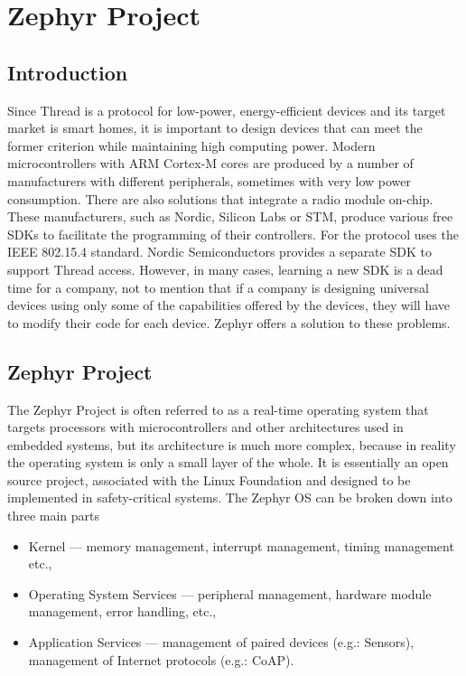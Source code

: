 \section{Zephyr Project}


\subsection{Introduction}
Since Thread is a protocol for low-power, energy-efficient devices and its target market is smart homes, it is important to design devices that can meet the former criterion while maintaining high computing power. Modern microcontrollers with ARM Cortex-M cores are produced by a number of manufacturers with different peripherals, sometimes with very low power consumption. There are also solutions that integrate a radio module on-chip. These manufacturers, such as Nordic, Silicon Labs or STM, produce various free SDKs to facilitate the programming of their controllers. For the protocol uses the IEEE 802.15.4 standard. Nordic Semiconductors provides a separate SDK to support Thread access. However, in many cases, learning a new SDK is a dead time for a company, not to mention that if a company is designing universal devices using only some of the capabilities offered by the devices, they will have to modify their code for each device. Zephyr offers a solution to these problems.


\subsection{Zephyr Project}
The Zephyr Project is often referred to as a real-time operating system that targets processors with microcontrollers and other architectures used in embedded systems, but its architecture is much more complex, because in reality the operating system is only a small layer of the whole. It is essentially an open source project, associated with the Linux Foundation and designed to be implemented in safety-critical systems. 
The Zephyr OS can be broken down into three main parts
\begin{itemize}
    \item Kernel --- memory management, interrupt management, timing management etc.,
    \item Operating System Services --- peripheral management, hardware module management, error handling, etc.,
    \item Application Services --- management of paired devices (e.g.: Sensors), management of Internet protocols (e.g.: CoAP).
\end{itemize}


